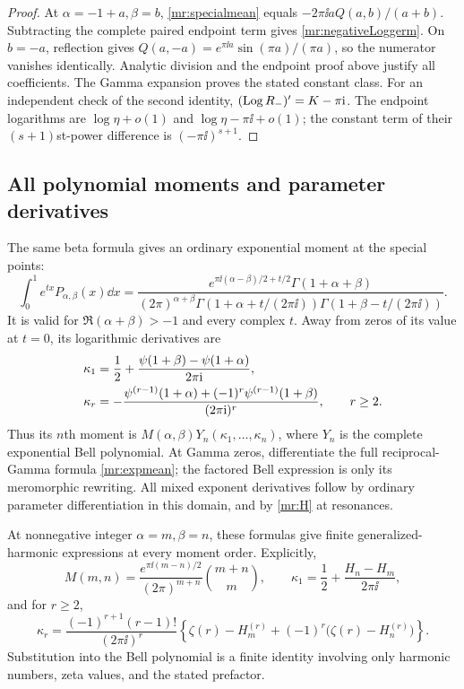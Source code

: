 \begin{proof}
At $\alpha=-1+a,\beta=b$, \eqref{mr:specialmean} equals
$-2\pi\ii aQ(a,b)/(a+b)$. Subtracting the complete paired endpoint
term gives \eqref{mr:negativeLoggerm}.
On $b=-a$, reflection gives
$Q(a,-a)=e^{\pi\ii a}\sin(\pi a)/(\pi a)$, so the numerator vanishes
identically. Analytic division and the endpoint proof above justify
all coefficients. The Gamma expansion proves the stated constant class.
For an independent check of the second identity,
$(\operatorname{Log} R_-)'=K-\pi\mathrm i$. The endpoint logarithms are
$\log\eta+o(1)$ and $\log\eta-\pi\ii+o(1)$; the constant term of
their $(s+1)$st-power difference is $(-\pi\ii)^{s+1}$.
\end{proof}

\subsection{All polynomial moments and parameter derivatives}

The same beta formula gives an ordinary exponential moment at the
special points:
\begin{equation}\label{mr:expmean}
 \int_0^1e^{tx}P_{\alpha,\beta}(x)\dd x
 =\frac{e^{\pi\ii(\alpha-\beta)/2+t/2}\Gamma(1+\alpha+\beta)}
 {(2\pi)^{\alpha+\beta}
   \Gamma(1+\alpha+t/(2\pi\ii))
   \Gamma(1+\beta-t/(2\pi\ii))}.
\end{equation}
It is valid for $\Re(\alpha+\beta)>-1$ and every complex $t$.
Away from zeros of its value at $t=0$, its logarithmic derivatives are
\begin{align}
 \kappa_1&=\frac12+\frac{\psi(1+\beta)-\psi(1+\alpha)}{2\pi\mathrm i},\notag\\
 \kappa_r&=-\frac{\psi^{(r-1)}(1+\alpha)
                    +(-1)^r\psi^{(r-1)}(1+\beta)}{(2\pi\mathrm i)^r},
                    \qquad r\ge2.\label{mr:cumulants}
\end{align}
Thus its $n$th moment is $M(\alpha,\beta)Y_n(\kappa_1,\ldots,\kappa_n)$,
where $Y_n$ is the complete exponential Bell polynomial. At Gamma zeros,
differentiate the full reciprocal-Gamma formula \eqref{mr:expmean};
the factored Bell expression is only its meromorphic rewriting.
All mixed exponent derivatives follow by ordinary parameter
differentiation in this domain, and by \eqref{mr:H} at resonances.

At nonnegative integer $\alpha=m,\beta=n$, these formulas give finite
generalized-harmonic expressions at every moment order. Explicitly,
\[
 M(m,n)=
 \frac{e^{\pi\ii(m-n)/2}}{(2\pi)^{m+n}}\binom{m+n}{m},
 \qquad
 \kappa_1=\frac12+\frac{H_n-H_m}{2\pi\ii},
\]
and for $r\ge2$,
\[
 \kappa_r=
 \frac{(-1)^{r+1}(r-1)!}{(2\pi\ii)^r}
 \left\{\zeta(r)-H_m^{(r)}
                 +(-1)^r\bigl(\zeta(r)-H_n^{(r)}\bigr)\right\}.
\]
Substitution into the Bell polynomial is a finite identity involving
only harmonic numbers, zeta values, and the stated prefactor.

